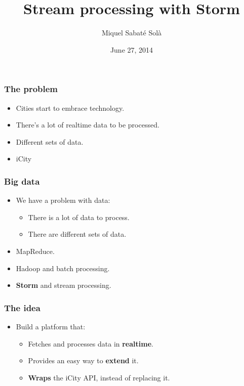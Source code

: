 \documentclass[12pt]{beamer}
\title{Stream processing with Storm}
\author{Miquel Sabaté Solà}
\date{June 27, 2014}
\begin{document}
\frame{\titlepage}


\begin{frame}
\vfill
  \frametitle{The problem}
  \begin{itemize}
    \item Cities start to embrace technology.
    \vfill
    \item There's a lot of realtime data to be processed.
    \vfill
    \item Different sets of data.
    \vfill
    \item iCity
    \vfill
  \end{itemize}
\vfill
\end{frame}

\begin{frame}
\vfill
  \frametitle{Big data}
  \begin{itemize}
    \item We have a problem with data:
    \vfill
    \begin{itemize}
      \item There is a lot of data to process.
      \vfill
      \item There are different sets of data.
    \end{itemize}
    \vfill
    \item MapReduce.
    \vfill
    \item Hadoop and batch processing.
    \vfill
    \item {\bf Storm} and stream processing.
    \vfill
  \end{itemize}
\vfill
\end{frame}

\begin{frame}
\vfill
  \frametitle{The idea}
  \begin{itemize}
    \item Build a platform that:
    \vfill
    \begin{itemize}
      \item Fetches and processes data in {\bf realtime}.
      \vfill
      \item Provides an easy way to {\bf extend} it.
      \vfill
      \item {\bf Wraps} the iCity API, instead of replacing it.
    \end{itemize}
  \end{itemize}
\vfill
\end{frame}
\end{document}
